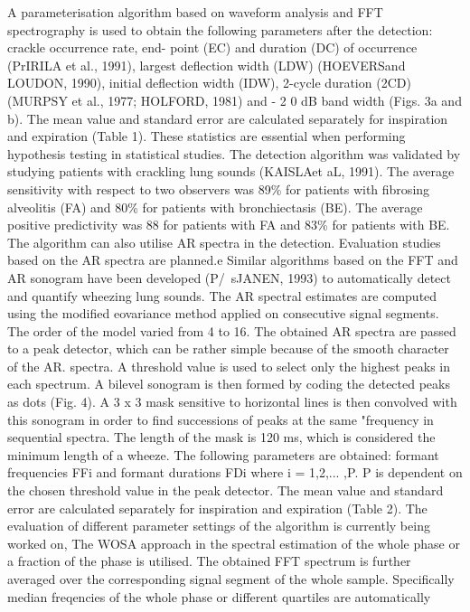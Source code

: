 A parameterisation algorithm based on waveform
analysis and FFT spectrography is used to obtain the following
parameters after the detection: crackle occurrence rate, end-
point (EC) and duration (DC) of occurrence (PrIRILA et al.,
1991), largest deflection width (LDW) (HOEVERSand LOUDON,
1990), initial deflection width (IDW), 2-cycle duration (2CD)
(MURPSY et al., 1977; HOLFORD, 1981) and - 2 0 dB band
width (Figs. 3a and b). The mean value and standard error are
calculated separately for inspiration and expiration (Table 1).
These statistics are essential when performing hypothesis
testing in statistical studies.
The detection algorithm was validated by studying patients
with crackling lung sounds (KAISLAet aL, 1991). The average
sensitivity with respect to two observers was 89\% for patients
with fibrosing alveolitis (FA) and 80\% for patients with
bronchiectasis (BE). The average positive predictivity was 88%
for patients with FA and 83\% for patients with BE. The
algorithm can also utilise AR spectra in the detection.
Evaluation studies based on the AR spectra are planned.e
Similar algorithms based on the FFT and AR sonogram have
been developed (P/~sJANEN, 1993) to automatically detect and
quantify wheezing lung sounds. The AR spectral estimates are
computed using the modified eovariance method applied on
consecutive signal segments. The order of the model varied
from 4 to 16. The obtained AR spectra are passed to a peak
detector, which can be rather simple because of the smooth
character of the AR. spectra. A threshold value is used to select
only the highest peaks in each spectrum. A bilevel sonogram is
then formed by coding the detected peaks as dots (Fig. 4). A
3 x 3 mask sensitive to horizontal lines is then convolved with
this sonogram in order to find successions of peaks at the same
"frequency in sequential spectra. The length of the mask is
120 ms, which is considered the minimum length of a wheeze.
The following parameters are obtained: formant frequencies
FFi and formant durations FDi where i = {1,2,... ,P}. P is
dependent on the chosen threshold value in the peak detector.
The mean value and standard error are calculated separately for
inspiration and expiration (Table 2). The evaluation of different
parameter settings of the algorithm is currently being worked
on,
The WOSA approach in the spectral estimation of the whole
phase or a fraction of the phase is utilised. The obtained FFT
spectrum is further averaged over the corresponding signal
segment of the whole sample. Specifically median freqencies of
the whole phase or different quartiles are automatically
